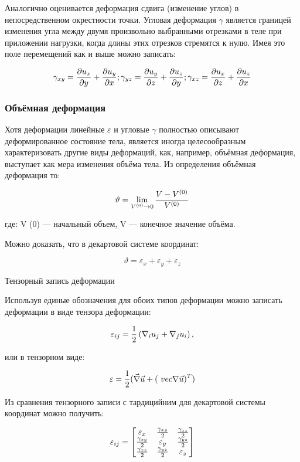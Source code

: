 Аналогично оценивается деформация сдвига (изменение углов) в непосредственном окрестности точки. Угловая деформация $\gamma$ является границей изменения угла между двумя произвольно выбранными отрезками в теле при приложении нагрузки, когда длины этих отрезков стремятся к нулю. Имея это поле перемещений как и выше можно записать:

\[\gamma_{xy} = {{\partial u_x} \over {\partial y}} + {{\partial u_y} \over {\partial x}}; \gamma_{yz} = {{\partial u_y} \over {\partial z}} + {{\partial u_z} \over {\partial y}}; \gamma_{xz} = {{\partial u_x} \over {\partial z}} + {{\partial u_z} \over {\partial x}} \]

\subsubsection{Объёмная деформация}

Хотя деформации линейные $\varepsilon$ и угловые $\gamma$ полностью описывают деформированное состояние тела, является иногда целесообразным характеризовать другие виды деформаций, как, например, объёмная деформация, выступает как мера изменения объёма тела. Из определения объёмная деформация то:

\[\vartheta = \lim_{V^{(0)} \to 0} {V - V^{(0)} \over {V^{(0)}}} \]

где: V (0) — начальный объем, V — конечное значение объёма.

Можно доказать, что в декартовой системе координат:

\[ \vartheta = \varepsilon_x + \varepsilon_y + \varepsilon_z \]

Тензорный запись деформации

Используя единые обозначения для обоих типов деформации можно записать деформации в виде тензора деформации:

\[  \varepsilon_{ij} = {1 \over 2} \left ({\nabla_i u_j + \nabla_j u_i} \right), \]

или в тензорном виде:

\[  \varepsilon = {1 \over 2} (\vec {\nabla} \vec {u} + (\ vec {\nabla} \vec {u}) ^ T) \]

Из сравнения тензорного записи с тардицийним для декартовой системы координат можно получить:

\[ \varepsilon_{ij} = \left [{\begin {matrix} {\varepsilon_x} & {{{\gamma _{xy}} \over 2}} & {{{\gamma_{xz}} \over 2}} \\ {{{\gamma_{xy}} \over 2}} & {\varepsilon_y} & {{{\gamma_{yz}} \over 2}} \\ {{{\gamma_{xz}} \over 2}} & {{{\gamma_{yz}} \over 2}} & {\varepsilon_z} \end{matrix}} \right] \]

